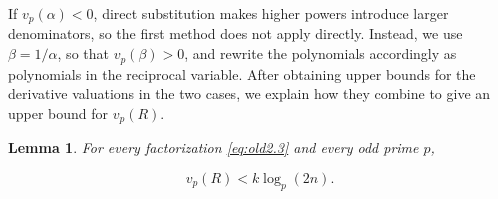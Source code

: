 \documentclass[11pt,a4paper]{article}
\numberwithin{equation}{section}
\newtheorem{lemma}[theorem]{Lemma}
\theoremstyle{definition}
\begin{document}
If \(v_p(\alpha)<0\), direct substitution makes higher powers introduce larger denominators, so the first method does not apply directly. Instead, we use \(\beta=1/\alpha\), so that \(v_p(\beta)>0\), and rewrite the polynomials accordingly as polynomials in the reciprocal variable. After obtaining upper bounds for the derivative valuations in the two cases, we explain how they combine to give an upper bound for \(v_p(R)\).

\begin{lemma}\label{prop:uniform}
For every factorization \eqref{eq:old2.3} and every odd prime \(p\),

\begin{equation}
v_p(R)<k\log_p(2n).
\label{eq:old4.1}
\end{equation}
\end{lemma}
\end{document}
